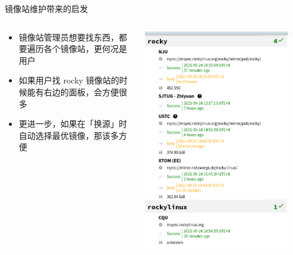 \documentclass{ctexbeamer}
\begin{document}
\begin{frame}{镜像站维护带来的启发}
  \begin{columns}
    \begin{column}{0.55\textwidth}
      \begin{itemize}
        \item 镜像站管理员想要找东西，都要遍历各个镜像站，更何况是用户
        \item 如果用户找 rocky 镜像站的时候能有右边的面板，会方便很多
        \item 更进一步，如果在「换源」时自动选择最优镜像，那该多方便
      \end{itemize}
    \end{column}
    \begin{column}{0.45\textwidth}
      \includegraphics[width=0.9\textwidth]{img/rocky.png}
    \end{column}
  \end{columns}
\end{frame}
\end{document}
